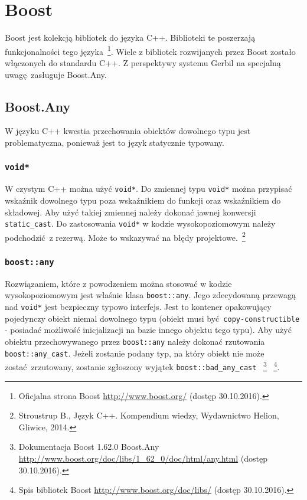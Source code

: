  \section{Boost}
Boost jest kolekcją bibliotek do języka C++. Biblioteki te poszerzają funkcjonalności tego języka~\footnote{Oficjalna strona Boost \url{http://www.boost.org/} (dostęp 30.10.2016).}. Wiele z bibliotek rozwijanych przez Boost zostało włączonych do standardu C++. Z perspektywy systemu Gerbil na specjalną uwagę zasługuje Boost.Any.



\subsection{Boost.Any}
W języku C++ kwestia przechowania obiektów dowolnego typu jest problematyczna, ponieważ jest to język statycznie typowany. 

\subsubsection{\lstinline$void*$}
W czystym C++ można użyć \lstinline$void*$. Do zmiennej typu \lstinline$void*$ można przypisać wskaźnik dowolnego typu poza wskaźnikiem do funkcji oraz wskaźnikiem do składowej. Aby użyć takiej zmiennej należy dokonać jawnej konwersji \lstinline$static_cast$. Do zastosowania \lstinline$void*$ w kodzie wysokopoziomowym należy podchodzić z rezerwą. Może to wskazywać na błędy projektowe.~\footnote{Stroustrup B., Język C++. Kompendium wiedzy, Wydawnictwo Helion, Gliwice, 2014.}

\subsubsection{\lstinline$boost::any$}
Rozwiązaniem, które z powodzeniem można stosować w kodzie wysokopoziomowym jest właśnie klasa \lstinline$boost::any$. Jego zdecydowaną przewagą nad \lstinline$void*$ jest bezpieczny typowo interfejs. Jest to kontener opakowujący pojedynczy obiekt niemal dowolnego typu (obiekt musi być \lstinline$copy-constructible$ - posiadać możliwość inicjalizacji na bazie innego objektu tego typu).
Aby użyć obiektu przechowywanego przez \lstinline$boost::any$ należy dokonać rzutowania \lstinline$boost::any_cast$. Jeżeli zostanie podany typ, na który obiekt nie może zostać zrzutowany, zostanie zgłoszony wyjątek \lstinline$boost::bad_any_cast$
~\footnote{Dokumentacja Boost 1.62.0 Boost.Any \url{http://www.boost.org/doc/libs/1_62_0/doc/html/any.html} (dostęp 30.10.2016).}
~\footnote{Spis bibliotek Boost \url{http://www.boost.org/doc/libs/} (dostęp 30.10.2016).}.

